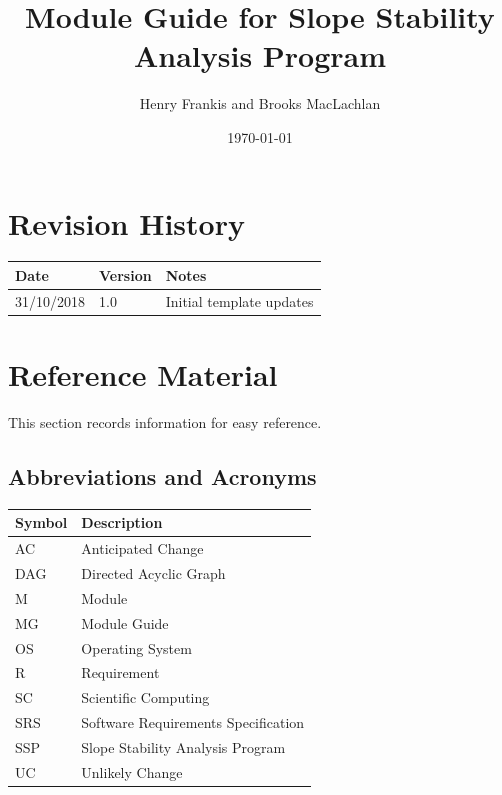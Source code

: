 \documentclass[12pt, titlepage]{article}
\newcommand{\progname}{SSP}
\begin{document}
\title{Module Guide for Slope Stability Analysis Program} 
\author{Henry Frankis and Brooks MacLachlan}
\date{\today}

\maketitle


\section{Revision History}

\begin{tabularx}{\textwidth}{p{3cm}p{2cm}X}
	\toprule {\bf Date} & {\bf Version} & {\bf Notes}\\
	\midrule
	31/10/2018 & 1.0 & Initial template updates\\
	\bottomrule
\end{tabularx}

\newpage

\section{Reference Material}
This section records information for easy reference.
\subsection{Abbreviations and Acronyms}

\renewcommand{\arraystretch}{1.2}
\begin{tabular}{l l} 
	\toprule		
	\textbf{Symbol} & \textbf{Description}\\
	\midrule 
	AC & Anticipated Change\\
	DAG & Directed Acyclic Graph \\
	M & Module \\
	MG & Module Guide \\
	OS & Operating System \\
	R & Requirement\\
	SC & Scientific Computing \\
	SRS & Software Requirements Specification\\
	\progname & Slope Stability Analysis Program\\
	UC & Unlikely Change \\
	\bottomrule
\end{tabular}\\
\end{document}
